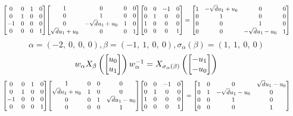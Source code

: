 \documentclass[11pt]{article}
\theoremstyle{definition}
\begin{document}
\[
\scaletoalign{\textwidth}{{\left[\begin{matrix}0 & 0 & 1 & 0\\0 & 1 & 0 & 0\\-1 & 0 & 0 & 0\\0 & 0 & 0 & 1\end{matrix}\right]} {\left[\begin{matrix}1 & 0 & 0 & 0\\0 & 1 & 0 & 0\\0 & - \sqrt{d} u_{1} + u_{0} & 1 & 0\\\sqrt{d} u_{1} + u_{0} & 0 & 0 & 1\end{matrix}\right]} {\left[\begin{matrix}0 & 0 & -1 & 0\\0 & 1 & 0 & 0\\1 & 0 & 0 & 0\\0 & 0 & 0 & 1\end{matrix}\right]} = {\left[\begin{matrix}1 & - \sqrt{d} u_{1} + u_{0} & 0 & 0\\0 & 1 & 0 & 0\\0 & 0 & 1 & 0\\0 & 0 & - \sqrt{d} u_{1} - u_{0} & 1\end{matrix}\right]}}
\]
\[
\alpha = \left( -2, \  0, \  0, \  0\right), \beta = \left( -1, \  1, \  0, \  0\right), \sigma_{\alpha}(\beta) = \left( 1, \  1, \  0, \  0\right)
\]
\[
\scaletoalign{\textwidth}{w_{\alpha} X_{\beta}\left(\left[\begin{matrix}u_{0}\\u_{1}\end{matrix}\right]\right) w_{\alpha}^{-1} = X_{\sigma_{\alpha}\left(\beta\right)}\left(\left[\begin{matrix}- u_{1}\\- u_{0}\end{matrix}\right]\right)}
\]
\[
\scaletoalign{\textwidth}{{\left[\begin{matrix}0 & 0 & 1 & 0\\0 & 1 & 0 & 0\\-1 & 0 & 0 & 0\\0 & 0 & 0 & 1\end{matrix}\right]} {\left[\begin{matrix}1 & 0 & 0 & 0\\\sqrt{d} u_{1} + u_{0} & 1 & 0 & 0\\0 & 0 & 1 & \sqrt{d} u_{1} - u_{0}\\0 & 0 & 0 & 1\end{matrix}\right]} {\left[\begin{matrix}0 & 0 & -1 & 0\\0 & 1 & 0 & 0\\1 & 0 & 0 & 0\\0 & 0 & 0 & 1\end{matrix}\right]} = {\left[\begin{matrix}1 & 0 & 0 & \sqrt{d} u_{1} - u_{0}\\0 & 1 & - \sqrt{d} u_{1} - u_{0} & 0\\0 & 0 & 1 & 0\\0 & 0 & 0 & 1\end{matrix}\right]}}
\]
\end{document}
